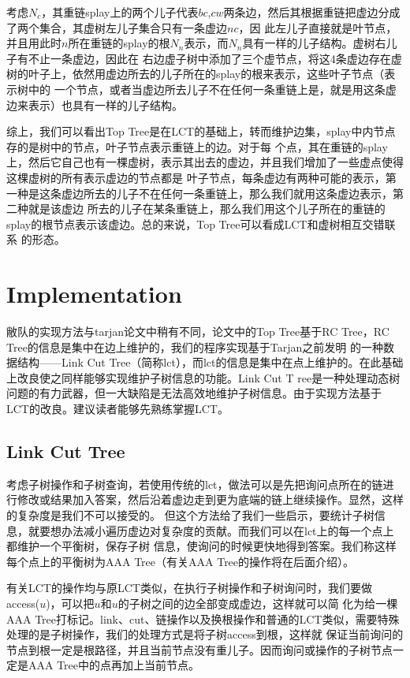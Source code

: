 ﻿\documentclass{article}
\begin{document}
		\indent 考虑$N_c$，其重链splay上的两个儿子代表$bc$,$cw$两条边，然后其根据重链把虚边分成了两个集合，其虚树左儿子集合只有一条虚边$nc$，因
		此左儿子直接就是叶节点，并且用此时$n$所在重链的splay的根$N_n$表示，而$N_n$具有一样的儿子结构。虚树右儿子有不止一条虚边，因此在
		右边虚子树中添加了三个虚节点，将这4条虚边存在虚树的叶子上，依然用虚边所去的儿子所在的splay的根来表示，这些叶子节点（表示树中的
		一个节点，或者当虚边所去儿子不在任何一条重链上是，就是用这条虚边来表示）也具有一样的儿子结构。\par
		\indent 综上，我们可以看出Top Tree是在LCT的基础上，转而维护边集，splay中内节点存的是树中的节点，叶子节点表示重链上的边。对于每
		个点，其在重链的splay上，然后它自己也有一棵虚树，表示其出去的虚边，并且我们增加了一些虚点使得这棵虚树的所有表示虚边的节点都是
		叶子节点，每条虚边有两种可能的表示，第一种是这条虚边所去的儿子不在任何一条重链上，那么我们就用这条虚边表示，第二种就是该虚边
		所去的儿子在某条重链上，那么我们用这个儿子所在的重链的splay的根节点表示该虚边。总的来说，Top Tree可以看成LCT和虚树相互交错联系
		的形态。
	\section{Implementation}
	敝队的实现方法与tarjan论文中稍有不同，论文中的Top Tree基于RC Tree，RC Tree的信息是集中在边上维护的，我们的程序实现基于Tarjan之前发明
	的一种数据结构——Link Cut Tree（简称lct），而lct的信息是集中在点上维护的。在此基础上改良使之同样能够实现维护子树信息的功能。Link Cut T
	ree是一种处理动态树问题的有力武器，但一大缺陷是无法高效地维护子树信息。由于实现方法基于LCT的改良。建议读者能够先熟练掌握LCT。
	\subsection{Link Cut Tree}
	考虑子树操作和子树查询，若使用传统的lct，做法可以是先把询问点所在的链进行修改或结果加入答案，然后沿着虚边走到更为底端的链上继续操作。显然，这样的复杂度是我们不可以接受的。
	但这个方法给了我们一些启示，要统计子树信息，就要想办法减小遍历虚边对复杂度的贡献。而我们可以在lct上的每一个点上都维护一个平衡树，保存子树
	信息，使询问的时候更快地得到答案。我们称这样每个点上的平衡树为AAA Tree（有关AAA Tree的操作将在后面介绍）。\par
	\indent 有关LCT的操作均与原LCT类似，在执行子树操作和子树询问时，我们要做access($u$)，可以把$u$和$u$的子树之间的边全部变成虚边，这样就可以简
	化为给一棵AAA Tree打标记。link、cut、链操作以及换根操作和普通的LCT类似，需要特殊处理的是子树操作，我们的处理方式是将子树access到根，这样就
	保证当前询问的节点到根一定是根路径，并且当前节点没有重儿子。因而询问或操作的子树节点一定是AAA Tree中的点再加上当前节点。
\end{document}
